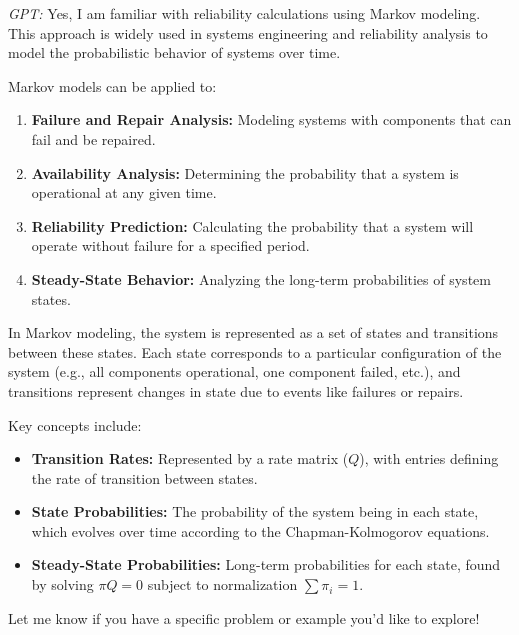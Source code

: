 \documentclass[a4paper,12pt]{article}
\begin{document}
	\begin{answerbox}
		\textit{GPT:} Yes, I am familiar with reliability calculations using Markov modeling. This approach is widely used in systems engineering and reliability analysis to model the probabilistic behavior of systems over time.
		
		Markov models can be applied to:
		\begin{enumerate}
			\item 
			\textbf{Failure and Repair Analysis:} Modeling systems with components that can fail and be repaired.
			
			\item 
			\textbf{Availability Analysis:} Determining the probability that a system is operational at any given time.
			
			\item 
			\textbf{Reliability Prediction:} Calculating the probability that a system will operate without failure for a specified period.
			
			\item 
			\textbf{Steady-State Behavior:} Analyzing the long-term probabilities of system states.
		\end{enumerate}
		
		In Markov modeling, the system is represented as a set of states and transitions between these states. Each state corresponds to a particular configuration of the system (e.g., all components operational, one component failed, etc.), and transitions represent changes in state due to events like failures or repairs.
		
		Key concepts include:
		\begin{itemize}
			\item 
			\textbf{Transition Rates:} Represented by a rate matrix ($Q$), with entries defining the rate of transition between states.
			
			\item 
			\textbf{State Probabilities:} The probability of the system being in each state, which evolves over time according to the Chapman-Kolmogorov equations.
			
			\item 
			\textbf{Steady-State Probabilities:} Long-term probabilities for each state, found by solving $\pi Q=0$ subject to normalization $\sum \pi_i=1$.
		\end{itemize}
		
		Let me know if you have a specific problem or example you'd like to explore!
	\end{answerbox}
	
\end{document}
